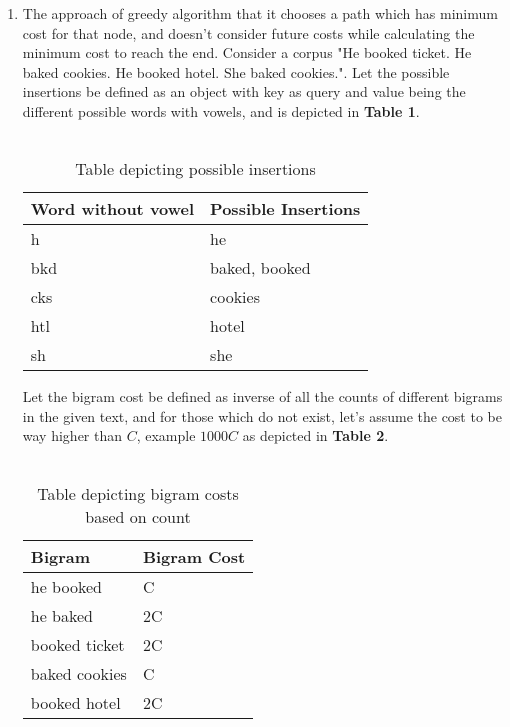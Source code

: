 \documentclass[12pt]{article}
\begin{document}
\begin{enumerate}[label=(\alph*)]
  \item The approach of greedy algorithm that it chooses a path which has minimum cost for that node, and doesn't consider future costs while calculating the minimum cost to reach the end. Consider a corpus "He booked ticket. He baked cookies. He booked hotel. She baked cookies.". Let the possible insertions be defined as an object with key as query and value being the different possible words with vowels, and is depicted in \textbf{Table 1}. \\ \\
\begin{table}
\centering
\caption{Table depicting possible insertions}
\begin{tabular}{|ll|} 
\hline
\textbf{Word without vowel} & \textbf{Possible Insertions}  \\ 
\hline
h                           & he                            \\ 
\hline
bkd                         & baked, booked                 \\ 
\hline
cks                         & cookies                       \\ 
\hline
htl                         & hotel                         \\ 
\hline
sh                          & she                           \\
\hline
\end{tabular}
\end{table}
Let the bigram cost be defined as inverse of all the counts of different bigrams in the given text, and for those which do not exist, let's assume the cost to be way higher than $C$, example $1000C$ as depicted in \textbf{Table 2}. \\ \\
\begin{table}
\centering
\caption{Table depicting bigram costs based on count}
\begin{tabular}{|ll|} 
\hline
\textbf{Bigram}  & \textbf{Bigram Cost}  \\ 
\hline
he booked        & C                     \\ 
\hline
he baked         & 2C                    \\ 
\hline
booked ticket    & 2C                    \\ 
\hline
baked cookies    & C                     \\ 
\hline
booked hotel     & 2C                    \\ 

\end{tabular}
\end{table}
\end{enumerate}
\end{document}

